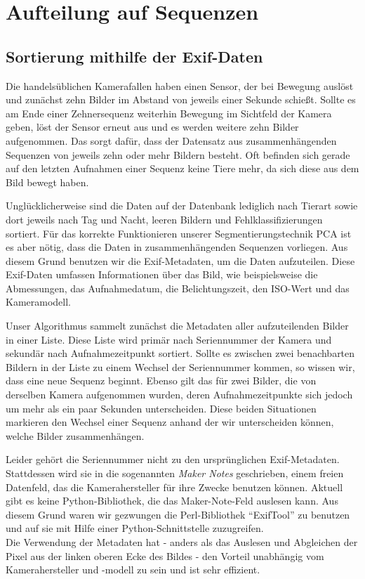 \section{Aufteilung auf Sequenzen}

\subsection{Sortierung mithilfe der Exif-Daten}

Die handelsüblichen Kamerafallen haben einen Sensor, der bei Bewegung auslöst und zunächst zehn Bilder im Abstand von jeweils einer Sekunde schießt. Sollte es am Ende einer Zehnersequenz weiterhin Bewegung im Sichtfeld der Kamera geben, löst der Sensor erneut aus und es werden weitere zehn Bilder aufgenommen. Das sorgt dafür, dass der Datensatz aus zusammenhängenden Sequenzen von jeweils zehn oder mehr Bildern besteht. Oft befinden sich gerade auf den letzten Aufnahmen einer Sequenz keine Tiere mehr, da sich diese aus dem Bild bewegt haben. 

Unglücklicherweise sind die Daten auf der Datenbank lediglich nach Tierart sowie dort jeweils nach Tag und Nacht, leeren Bildern und Fehlklassifizierungen sortiert. Für das korrekte Funktionieren unserer Segmentierungstechnik PCA ist es aber nötig, dass die Daten in zusammenhängenden Sequenzen vorliegen. Aus diesem Grund benutzen wir die Exif-Metadaten, um die Daten aufzuteilen. Diese Exif-Daten umfassen Informationen über das Bild, wie beispielsweise die Abmessungen, das Aufnahmedatum, die Belichtungszeit, den ISO-Wert und das Kameramodell.

Unser Algorithmus sammelt zunächst die Metadaten aller aufzuteilenden Bilder in einer Liste. Diese Liste wird primär nach Seriennummer der Kamera und sekundär nach Aufnahmezeitpunkt sortiert. Sollte es zwischen zwei benachbarten Bildern in der Liste zu einem Wechsel der Seriennummer kommen, so wissen wir, dass eine neue Sequenz beginnt. Ebenso gilt das für zwei Bilder, die von derselben Kamera aufgenommen wurden, deren Aufnahmezeitpunkte sich jedoch um mehr als ein paar Sekunden unterscheiden. Diese beiden Situationen markieren den Wechsel einer Sequenz anhand der wir unterscheiden können, welche Bilder zusammenhängen.

Leider gehört die Seriennummer nicht zu den ursprünglichen Exif-Metadaten. Stattdessen wird sie in die sogenannten \emph{Maker Notes} geschrieben, einem freien Datenfeld, das die Kamerahersteller für ihre Zwecke benutzen können. Aktuell gibt es keine Python-Bibliothek, die das Maker-Note-Feld auslesen kann. Aus diesem Grund waren wir gezwungen die Perl-Bibliothek \enquote{ExifTool} \cite{exif} zu benutzen und auf sie mit Hilfe einer Python-Schnittstelle zuzugreifen. \\
Die Verwendung der Metadaten hat - anders als das Auslesen und Abgleichen der Pixel aus der linken oberen Ecke des Bildes - den Vorteil unabhängig vom Kamerahersteller und -modell zu sein und ist sehr effizient.

